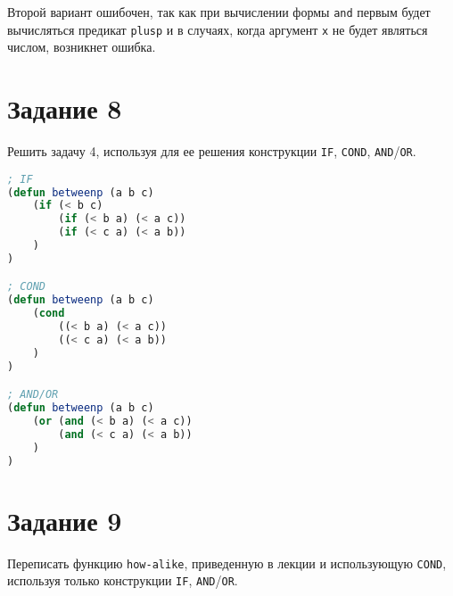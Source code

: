 Второй вариант ошибочен, так как при вычислении формы \texttt{and} первым будет вычисляться предикат \texttt{plusp} и в случаях, когда аргумент \texttt{x} не будет являться числом, возникнет ошибка.

\section{Задание 8}

Решить задачу 4, используя для ее решения конструкции
\texttt{IF}, \texttt{COND}, \texttt{AND}/\texttt{OR}.

\begin{lstlisting}[language=Lisp]
; IF
(defun betweenp (a b c)
	(if (< b c)
		(if (< b a) (< a c))
		(if (< c a) (< a b))
	)
)

; COND
(defun betweenp (a b c)
	(cond
		((< b a) (< a c))
		((< c a) (< a b))
	)
)

; AND/OR
(defun betweenp (a b c)
	(or (and (< b a) (< a c))
		(and (< c a) (< a b))
	)
)
\end{lstlisting}

\clearpage

\section{Задание 9}

Переписать функцию \texttt{how-alike}, приведенную в лекции и использующую \texttt{COND}, используя
только конструкции \texttt{IF}, \texttt{AND}/\texttt{OR}.
